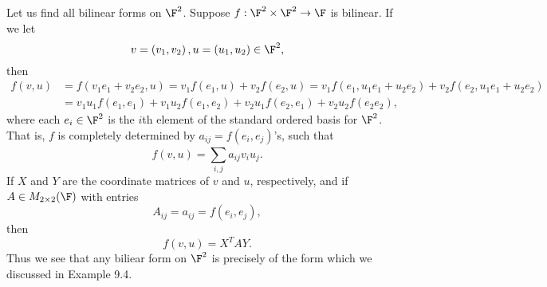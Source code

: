 \documentclass[linearalgebra]{subfiles}
\begin{document}
    \begin{example}
        Let us find all bilinear forms on $\F^2$. Suppose $f:\F^2\times\F^2\to\F$ is bilinear. If we let
        \begin{equation*}
            v = \left( v_1,v_2 \right) , u = \left( u_1,u_2 \right) \in\F^2,
        \end{equation*}
        then
        \begin{align*}
            f(v,u) & = f\left( v_1e_1+v_2e_2, u \right) = v_1f\left( e_1,u \right) + v_2f\left( e_2,u \right) = v_1f\left( e_1,u_1e_1+u_2e_2 \right) + v_2f\left( e_2,u_1e_1+u_2e_2 \right) \\
                   & = v_1u_1f\left( e_1,e_1 \right) + v_1u_2f\left( e_1,e_2 \right) + v_2u_1f\left( e_2,e_1 \right) + v_2u_2f\left( e_2e_2 \right) ,
        \end{align*} 
        where each $e_i\in\F^2$ is the $i$th element of the standard ordered basis for $\F^2$. That is, $f$ is completely determined by $a_{ij}=f(e_i,e_j)$'s, such that
        \begin{equation*}
            f(v,u) = \sum^{}_{i,j} a_{ij}v_iu_j.
        \end{equation*}
        If $X$ and $Y$ are the coordinate matrices of $v$ and $u$, respectively, and if $A\in M_{2\times 2}(\F)$ with entries
        \begin{equation*}
            A_{ij} = a_{ij} = f\left( e_i,e_j \right) ,
        \end{equation*}
        then
        \begin{equation*}
            f(v,u) = X^TAY.
        \end{equation*}
        Thus we see that any biliear form on $\F^2$ is precisely of the form which we discussed in Example 9.4.
    \end{example}
\end{document}
